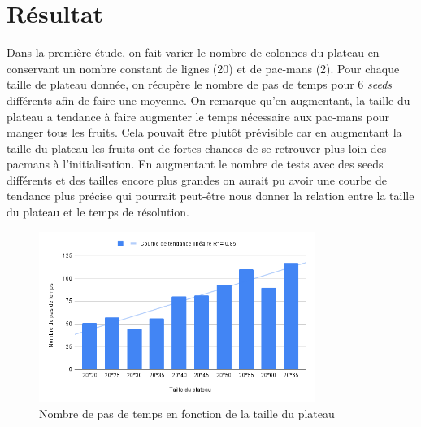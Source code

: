 \section{Résultat}

Dans la première étude, on fait varier le nombre de colonnes du plateau en conservant un nombre constant de lignes (20) et de pac-mans (2). Pour chaque taille de plateau donnée, on récupère le nombre de pas de temps pour 6 \textit{seeds} différents afin de faire une moyenne. On remarque qu’en augmentant, la taille du plateau a tendance à faire augmenter le temps nécessaire aux pac-mans pour manger tous les fruits. Cela pouvait être plutôt prévisible car en augmentant la taille du plateau les fruits ont de fortes chances de se retrouver plus loin des pacmans à l’initialisation.
En augmentant le nombre de tests avec des seeds différents et des tailles encore plus grandes on aurait pu avoir une courbe de tendance plus précise qui pourrait peut-être nous donner la relation entre la taille du plateau et le temps de résolution.

\begin{figure}[H]
	\centering
	\includegraphics[width=0.8\textwidth]{image/resultat1}
	\caption{Nombre de pas de temps en fonction de la taille du plateau}
\end{figure}

